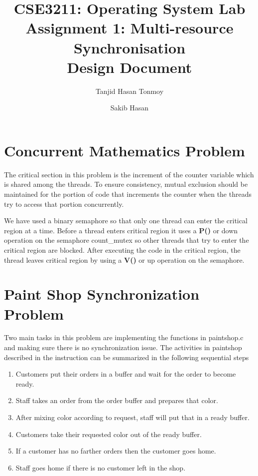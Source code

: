 \documentclass[11pt, english]{article}
\title{CSE3211: Operating System Lab \\ Assignment 1: Multi-resource Synchronisation \\ Design Document } %
\author{Tanjid Hasan Tonmoy
	\and
Sakib Hasan
}
\date{}
\begin{document}
\maketitle


\section{Concurrent Mathematics Problem}

The critical section in this problem is the increment of the counter variable which is shared among the threads.
To ensure consistency, mutual exclusion should be maintained for the portion of code that increments the counter when the threads try to access that portion concurrently.

We have used a binary semaphore so that only one thread can enter the critical region at a time. Before a thread enters critical region it uses a \textbf{P()} or down operation on the semaphore count\_mutex so other threads that try to enter the critical region are blocked. After executing the code in the critical region, the thread leaves critical region by using a \textbf{V()} or up operation on the semaphore.

\section{Paint Shop Synchronization Problem}

Two main tasks in this problem are implementing the functions in paintshop.c and making sure there is no synchronization issue.
The activities in paintshop described in the instruction can be summarized in the following sequential steps
\begin{enumerate}
 \item Customers put their orders in a buffer and wait for the order to become ready.
 \item Staff takes an order from the order buffer and prepares that color.
 \item After mixing color according to request, staff will put that in a ready buffer.
 \item Customers take their requested color out of the ready buffer.
 \item If a customer has no farther orders then the customer goes home.
 \item Staff goes home if there is no customer left in the shop.
\end{enumerate}
\end{document}
